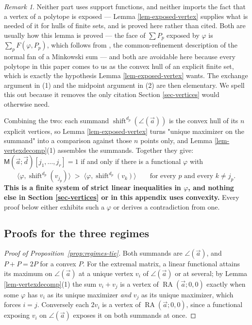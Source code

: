 \documentclass[11pt, a4paper, abstract=yes]{scrartcl}
\theoremstyle{definition}
\theoremstyle{remark}
\newtheorem{remark}[definition]{Remark}
\theoremstyle{plain}
\newcommand{\shift}{\operatorname{shift}}
\newcommand{\rasimp}{\angle}
\newcommand{\RA}{\operatorname{RA}}
\newcommand{\extten}{\mathsf{M}}
\begin{document}
\begin{remark}
Neither part uses support functions, and neither imports the fact that a vertex of a polytope is
exposed --- Lemma \ref{lem-exposed-vertex} supplies what is needed of it for hulls of finite sets, and
is proved here rather than cited. Both are usually how this lemma is proved --- the face of \(\sum P_p\) exposed by
\(\varphi\) is \(\sum_pF(\varphi,P_p)\), which follows from \textcite[Proposition 7.12]{Ziegler1995},
the common-refinement description of the normal fan of a Minkowski sum --- and both
are avoidable here because every polytope in this paper comes to us as the convex hull of an
explicit finite set, which is exactly the hypothesis Lemma \ref{lem-exposed-vertex} wants. The
exchange argument in (1) and the midpoint argument in (2) are then elementary. We spell this out
because it removes the only citation Section \ref{sec-vertices} would otherwise need.
\label{rem-no-support-functions}
\end{remark}

Combining the two: each summand \(\shift^{d_p}(\rasimp(\vec a))\) is the convex hull of its \(n\)
explicit vertices, so Lemma \ref{lem-exposed-vertex} turns "unique maximizer on the summand" into a
comparison against those \(n\) points only, and Lemma \ref{lem-vertexdecomp}(1) assembles the summands.
Together they give: \(\extten(\vec a;\vec d)[j_1,\dots,j_r]=1\) if and only if there is a
functional \(\varphi\) with
\begin{equation}\label{eq:no-support-functions}
  \bigl\langle\varphi,\shift^{d_p}(v_{j_p})\bigr\rangle
  \;>\;\bigl\langle\varphi,\shift^{d_p}(v_{k})\bigr\rangle
  \qquad\text{for every }p\text{ and every }k\ne j_p .
\end{equation}
\textbf{This is a finite system of strict linear inequalities in \(\varphi\), and nothing else in
Section \ref{sec-vertices} or in this appendix uses convexity.} Every proof below either exhibits
such a \(\varphi\) or derives a
contradiction from one.
\subsection{Proofs for the three regimes}
\label{sec-app-regimes}
\begin{proof}[Proof of Proposition~\ref{prop:regimes-tie}]
Both summands are \(\rasimp(\vec a)\), and \(P+P=2P\) for a convex \(P\). For the extremal matrix,
a linear functional attains its maximum on \(\rasimp(\vec a)\) at a unique vertex \(v_i\) of
\(\rasimp(\vec a)\) or at
several; by Lemma \ref{lem-vertexdecomp}(1) the sum \(v_i+v_j\) is a vertex of \(\RA(\vec a;0,0)\)
exactly when some \(\varphi\)
has \(v_i\) as its unique maximizer \emph{and} \(v_j\) as its unique maximizer, which forces \(i=j\).
Conversely each \(2v_i\) is a vertex of \(\RA(\vec a;0,0)\), since a functional exposing \(v_i\) on
\(\rasimp(\vec a)\) exposes it on both summands at once.
\end{proof}
\end{document}
